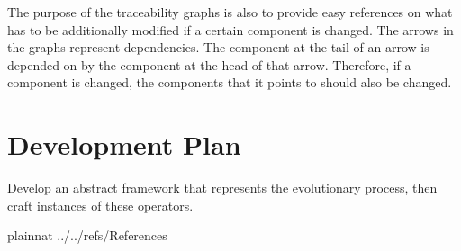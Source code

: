 \documentclass[12pt]{article}
\begin{document}
{}

The purpose of the traceability graphs is also to provide easy references on
what has to be additionally modified if a certain component is changed.  The
arrows in the graphs represent dependencies. The component at the tail of an
arrow is depended on by the component at the head of that arrow. Therefore, if a
component is changed, the components that it points to should also be
changed. 

\section{Development Plan}

Develop an abstract framework that represents the evolutionary process, then craft instances of these operators.


\newpage

 {plainnat}
 {../../refs/References}

\newpage
\end{document}
